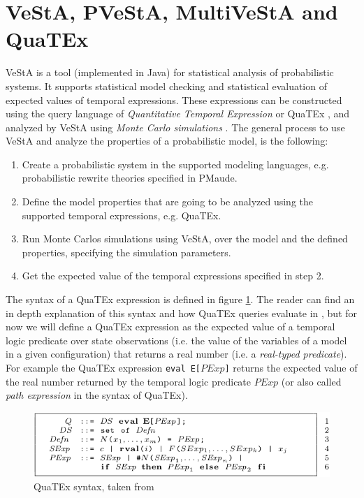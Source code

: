 \section{VeStA, PVeStA, MultiVeStA and QuaTEx}
VeStA \cite{Vesta} is a tool (implemented in Java) for statistical analysis of probabilistic systems. It supports statistical model checking and statistical evaluation of expected values of temporal expressions. These expressions can be constructed using the query language of  \textit{Quantitative Temporal Expression} or QuaTEx \cite{Agha2006}, and analyzed by VeStA using \textit{Monte Carlo simulations} . 
The general process to use VeStA and analyze the properties of a probabilistic model, is the following:
\begin{enumerate}
    \item Create a probabilistic system in the supported modeling languages, e.g. probabilistic rewrite theories specified in PMaude.
    \item Define the model properties that are going to be analyzed using the supported temporal expressions, e.g. QuaTEx.
    \item Run Monte Carlos simulations using VeStA, over the model and the defined properties, specifying the simulation parameters.
    \item Get the expected value of the temporal expressions specified in step 2.
\end{enumerate}
The syntax of a QuaTEx expression is defined in figure \ref{fig:multivesta}. The reader can find an in depth explanation of this syntax and how QuaTEx queries evaluate in \cite{Agha2006,multivesta}, but for now we will define a QuaTEx expression as the expected value of a temporal logic predicate over state observations (i.e. the value of the variables of a model in a given configuration) that returns a real number (i.e. a \textit{real-typed predicate}). For example the QuaTEx expression \texttt{eval E[$PExp$]} returns the expected value of the real number returned by the temporal logic predicate $PExp$ (or also called \textit{path expression} in the syntax of QuaTEx).  
\begin{figure}[h]
    \centering
    \includegraphics[scale = 0.4]{images/quatex1.png}
    \caption{QuaTEx syntax, taken from \cite{multivesta}}
    \label{fig:multivesta}
\end{figure}

